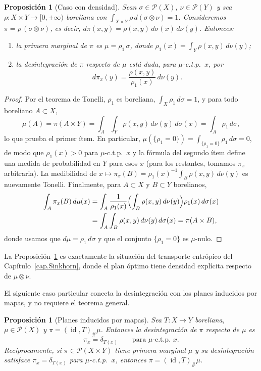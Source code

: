 \documentclass[12pt, a4paper]{amsbook}
\newcommand{\id}{\operatorname{id}}
\newtheorem{prop}[teo]{Proposición}
\theoremstyle{remark}
\theoremstyle{definition}
\numberwithin{section}{chapter}
\numberwithin{subsection}{section}
\numberwithin{equation}{section}
\numberwithin{figure}{chapter}
\begin{document}
\begin{prop}[Caso con densidad]\label{prop.desint.densidad}
Sean $\sigma\in\mathcal P(X)$, $\nu\in\mathcal P(Y)$ y sea
$\rho\colon X\times Y\to[0,+\infty)$ boreliana con
$\int_{X\times Y}\rho\,d(\sigma\otimes\nu)=1$. Consideremos
$\pi=\rho\,(\sigma\otimes\nu)$, es decir, $d\pi(x,y)=\rho(x,y)\,d\sigma(x)\,d\nu(y)$.
Entonces:
\begin{enumerate}
\item la primera marginal de $\pi$ es $\mu=\rho_1\,\sigma$, donde
$\rho_1(x)=\int_Y\rho(x,y)\,d\nu(y)$;
\item la desintegración de $\pi$ respecto de $\mu$ está dada, para $\mu$-c.t.p.\
$x$, por
\[
d\pi_x(y)=\frac{\rho(x,y)}{\rho_1(x)}\,d\nu(y).
\]
\end{enumerate}
\end{prop}

\begin{proof}
Por el teorema de Tonelli, $\rho_1$ es boreliana, $\int_X\rho_1\,d\sigma=1$, y
para todo boreliano $A\subset X$,
\[
\mu(A)=\pi(A\times Y)=\int_A\int_Y\rho(x,y)\,d\nu(y)\,d\sigma(x)=\int_A\rho_1\,d\sigma,
\]
lo que prueba el primer ítem. En particular, $\mu(\{\rho_1=0\})=\int_{\{\rho_1=0\}}\rho_1\,d\sigma=0$,
de modo que $\rho_1(x)>0$ para $\mu$-c.t.p.\ $x$ y la fórmula del segundo ítem
define una medida de probabilidad en $Y$ para esos $x$ (para los restantes,
tomamos $\pi_x$ arbitraria). La medibilidad de $x\mapsto\pi_x(B)=\rho_1(x)^{-1}\int_B\rho(x,y)\,d\nu(y)$
es nuevamente Tonelli. Finalmente, para $A\subset X$ y $B\subset Y$ borelianos,
\begin{align*}
\int_A\pi_x(B)\,d\mu(x)
&=\int_A\frac{1}{\rho_1(x)}\Bigl(\int_B\rho(x,y)\,d\nu(y)\Bigr)\rho_1(x)\,d\sigma(x)\\
&=\int_A\int_B\rho(x,y)\,d\nu(y)\,d\sigma(x)
=\pi(A\times B),
\end{align*}
donde usamos que $d\mu=\rho_1\,d\sigma$ y que el conjunto $\{\rho_1=0\}$ es
$\mu$-nulo.
\end{proof}

La Proposición~\ref{prop.desint.densidad} es exactamente la situación del
transporte entrópico del Capítulo~\ref{cap.Sinkhorn}, donde el plan óptimo tiene
densidad explícita respecto de $\mu\otimes\nu$.

El siguiente caso particular conecta la desintegración con los planes
inducidos por mapas, y no requiere el teorema general.

\begin{prop}[Planes inducidos por mapas]\label{prop.desint.mapa}
Sea $T\colon X\to Y$ boreliana, $\mu\in\mathcal P(X)$ y $\pi=(\id,T)_\#\mu$.
Entonces la desintegración de $\pi$ respecto de $\mu$ es
\[
\pi_x=\delta_{T(x)}
\qquad\text{para }\mu\text{-c.t.p.\ }x.
\]
Recíprocamente, si $\pi\in\mathcal P(X\times Y)$ tiene primera marginal $\mu$ y
su desintegración satisface $\pi_x=\delta_{T(x)}$ para $\mu$-c.t.p.\ $x$,
entonces $\pi=(\id,T)_\#\mu$.
\end{prop}
\end{document}
